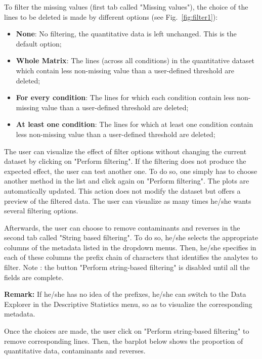 \documentclass[12pt]{article}
\begin{document}
{To filter the missing values (first tab called "Missing values"), the choice 
of the lines to be deleted is made by different options (see 
Fig.~\ref{fig:filter1}):
\begin {itemize}
\item\textbf{None}: No filtering, the quantitative data is left unchanged. 
This is the default option;
\item\textbf{Whole Matrix}: The lines (across all conditions) in the 
quantitative dataset which contain less non-missing value than a 
user-defined threshold are deleted;
\item\textbf{For every condition}: The lines for which each condition 
contain less non-missing value than a user-defined threshold are deleted;
\item\textbf{At least one condition}: The lines for which at least one 
condition contain less non-missing value than a user-defined threshold 
are deleted;
\end {itemize}

The user can visualize the effect of filter options without changing the 
current dataset by clicking on "Perform filtering". If the filtering does not 
produce the expected effect, the user can test another one. To do so, one 
simply has to choose another method in the list and click again on "Perform 
filtering". The plots are automatically updated. This action does not modify 
the dataset but offers a preview of the filtered data. The user can visualize 
as many times he/she wants several filtering options. 

Afterwards, the user can choose to remove contaminants and reverses in the 
second tab called "String based filtering". To do so, he/she selects the 
appropriate columns of the metadata listed in the dropdown menus. Then, 
he/she specifies in each of these columns the prefix chain of characters 
that identifies the analytes to filter. Note : the button "Perform string-based 
filtering" is disabled until all the fields are complete.

\textbf{Remark:} If he/she has no idea of the prefixes, he/she can switch to 
the Data Explorer in the Descriptive Statistics menu, so as to visualize the 
corresponding metadata. 

Once the choices are made, the user click on "Perform string-based filtering" 
to remove corresponding lines. Then, the barplot below  shows the 
proportion of quantitative data, contaminants and reverses. 

}
\end{document}
